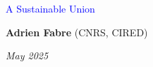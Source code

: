 \documentclass[aspectratio=169,xcolor=dvipsnames, 11pt,mathserif]{beamer}
\begin{document}
\begin{frame}
\thispagestyle{empty}
\begin{center}
\begin{LARGE}
\textcolor{blue}{A Sustainable Union}
\end{LARGE}

\vspace{1cm}
\textbf{Adrien Fabre} (CNRS, CIRED)%




\medskip
{}
\textit{May 2025} 

\end{center}

\bigskip

\end{frame}
\end{document}
